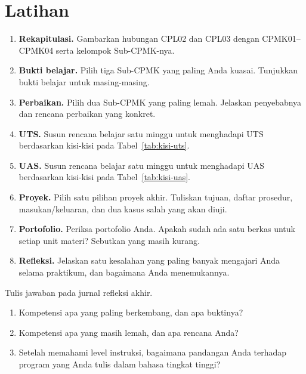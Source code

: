 \section{Latihan}
\label{sec:latihan-bab17}

\begin{enumerate}
    \item \textbf{Rekapitulasi.} Gambarkan hubungan CPL02 dan CPL03
          dengan CPMK01--CPMK04 serta kelompok Sub-CPMK-nya.

    \item \textbf{Bukti belajar.} Pilih tiga Sub-CPMK yang paling
          Anda kuasai. Tunjukkan bukti belajar untuk masing-masing.

    \item \textbf{Perbaikan.} Pilih dua Sub-CPMK yang paling lemah.
          Jelaskan penyebabnya dan rencana perbaikan yang konkret.

    \item \textbf{UTS.} Susun rencana belajar satu minggu untuk
          menghadapi UTS berdasarkan kisi-kisi pada
          Tabel~\ref{tab:kisi-uts}.

    \item \textbf{UAS.} Susun rencana belajar satu minggu untuk
          menghadapi UAS berdasarkan kisi-kisi pada
          Tabel~\ref{tab:kisi-uas}.

    \item \textbf{Proyek.} Pilih satu pilihan proyek akhir. Tuliskan
          tujuan, daftar prosedur, masukan/keluaran, dan dua kasus
          salah yang akan diuji.

    \item \textbf{Portofolio.} Periksa portofolio Anda. Apakah sudah
          ada satu berkas  untuk setiap unit materi?
          Sebutkan yang masih kurang.

    \item \textbf{Refleksi.} Jelaskan satu kesalahan yang paling
          banyak mengajari Anda selama praktikum, dan bagaimana Anda
          menemukannya.
\end{enumerate}

\begin{refleksibox}
\vspace{1.1em}
Tulis jawaban pada jurnal refleksi akhir.
\begin{enumerate}
    \item Kompetensi apa yang paling berkembang, dan apa buktinya?
    \item Kompetensi apa yang masih lemah, dan apa rencana Anda?
    \item Setelah memahami level instruksi, bagaimana pandangan Anda
          terhadap program yang Anda tulis dalam bahasa tingkat
          tinggi?
\end{enumerate}
\end{refleksibox}
